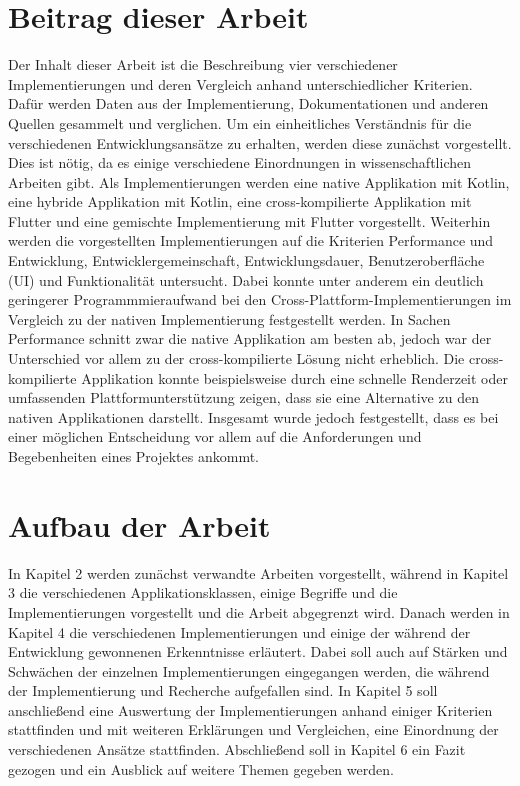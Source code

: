 \section{Beitrag dieser Arbeit}
Der Inhalt dieser Arbeit ist die Beschreibung vier verschiedener Implementierungen und deren Vergleich anhand unterschiedlicher Kriterien. Dafür werden Daten aus der Implementierung, Dokumentationen und anderen Quellen gesammelt und verglichen.
Um ein einheitliches Verständnis für die verschiedenen Entwicklungsansätze zu erhalten, werden diese zunächst vorgestellt. Dies ist nötig, da es einige verschiedene Einordnungen in wissenschaftlichen Arbeiten gibt.
Als Implementierungen werden eine native Applikation mit Kotlin, eine hybride Applikation mit Kotlin, eine cross-kompilierte Applikation mit Flutter und eine gemischte Implementierung mit Flutter vorgestellt. 
Weiterhin werden die vorgestellten Implementierungen auf die Kriterien Performance und Entwicklung, Entwicklergemeinschaft, Entwicklungsdauer, Benutzeroberfläche (UI) und Funktionalität untersucht.
Dabei konnte unter anderem ein deutlich geringerer Programmmieraufwand bei den Cross-Plattform-Implementierungen im Vergleich zu der nativen Implementierung festgestellt werden. In Sachen Performance schnitt zwar die native Applikation am besten ab, jedoch war der Unterschied vor allem zu der cross-kompilierte Lösung nicht erheblich. Die cross-kompilierte Applikation konnte beispielsweise durch eine schnelle Renderzeit oder umfassenden Plattformunterstützung zeigen, dass sie eine Alternative zu den nativen Applikationen darstellt. Insgesamt wurde jedoch festgestellt, dass es bei einer möglichen Entscheidung vor allem auf die Anforderungen und Begebenheiten eines Projektes ankommt.

\section{Aufbau der Arbeit}
In Kapitel 2 werden zunächst verwandte Arbeiten vorgestellt, während in Kapitel 3 die verschiedenen Applikationsklassen, einige Begriffe und die Implementierungen vorgestellt und die Arbeit abgegrenzt wird.
Danach werden in Kapitel 4 die verschiedenen Implementierungen und einige der während der Entwicklung gewonnenen Erkenntnisse erläutert. Dabei soll auch auf Stärken und Schwächen der einzelnen Implementierungen eingegangen werden, die während der Implementierung und Recherche aufgefallen sind.
In Kapitel 5 soll anschließend eine Auswertung der Implementierungen anhand einiger Kriterien stattfinden und mit weiteren Erklärungen und Vergleichen, eine Einordnung der verschiedenen Ansätze stattfinden. Abschließend soll in Kapitel 6 ein Fazit gezogen und ein Ausblick auf weitere Themen gegeben werden.
